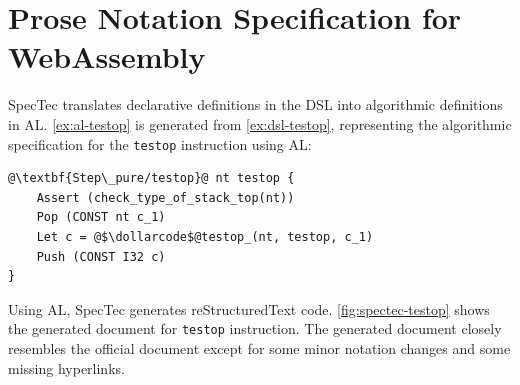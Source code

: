 \section{Prose Notation Specification for WebAssembly}
\label{sec:spectec-prose}

SpecTec translates declarative definitions in the DSL into algorithmic
definitions in AL.
\cref{ex:al-testop} is generated from \cref{ex:dsl-testop}, representing the
algorithmic specification for the \texttt{testop} instruction using AL:
\\
\begin{example}
\begin{lstlisting}[style=al]
@\textbf{Step\_pure/testop}@ nt testop {
    Assert (check_type_of_stack_top(nt))
    Pop (CONST nt c_1)
    Let c = @$\dollarcode$@testop_(nt, testop, c_1)
    Push (CONST I32 c)
}
\end{lstlisting}
  \label{ex:al-testop}
\end{example}
Using AL, SpecTec generates reStructuredText code.
\cref{fig:spectec-testop} shows the generated document for \texttt{testop}
instruction.
The generated document closely resembles the official document except for some
minor notation changes and some missing hyperlinks.
